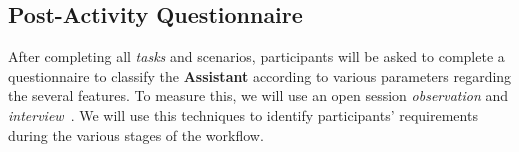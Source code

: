 \subsection{Post-Activity Questionnaire}

After completing all \textit{tasks} and scenarios, participants will be asked to complete a questionnaire to classify the \textbf{Assistant} according to various parameters regarding the several features. To measure this, we will use an open session \textit{observation} and \textit{interview}~\cite{carayon2015systematic}. We will use this techniques to identify participants' requirements during the various stages of the workflow.

